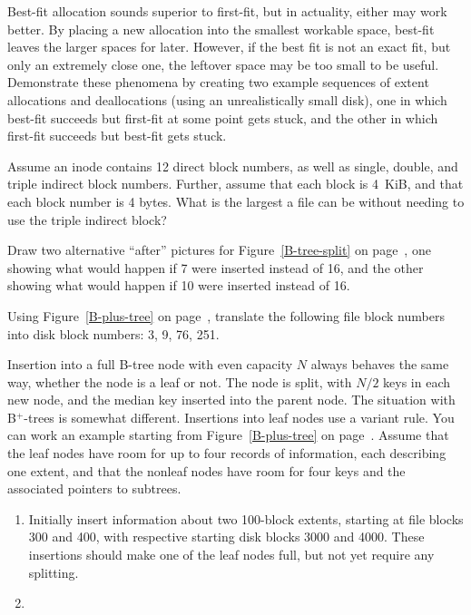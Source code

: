 \begin{chapterEnumerate}
\item\label{best-fit-first-fit-exercise}
Best-fit allocation sounds superior to first-fit, but in actuality,
either may work better.  By placing a new allocation into the smallest
workable space, best-fit leaves the larger spaces for later.  However,
if the best fit is not an exact fit, but only an extremely close one,
the leftover space may be too small to be useful.  Demonstrate these
phenomena by creating two example sequences of extent allocations and
deallocations (using an unrealistically small disk), one in which
best-fit succeeds but first-fit at some point gets stuck, and the
other in which first-fit succeeds but best-fit gets stuck.
\item\label{largest-double-indirect-exercise}
Assume an inode contains 12 direct block numbers, as well as single,
double, and triple indirect block numbers.  Further, assume that each
block is 4~KiB, and that each block number is 4 bytes.  What is the
largest a file can be without needing to use the triple indirect block?
\item
Draw two alternative ``after'' pictures for Figure~\ref{B-tree-split}
on page~\pageref{B-tree-split},
one showing what would happen if 7 were inserted instead of 16, and
the other showing what would happen if 10 were inserted instead of 16.
\item
Using Figure~\ref{B-plus-tree} on page~\pageref{B-plus-tree}, translate the following file block
numbers into disk block numbers: 3, 9, 76, 251.
\item\label{Bplus-tree-insertion-exercise}
Insertion into a full B-tree node with even capacity $N$
always behaves the same way, whether the node is a leaf or not.  The
node is split, with $N/2$ keys in each new node, and the median key
inserted into the parent node.  The situation with B${}^+$-trees is
somewhat different.  Insertions into leaf nodes use a variant rule.
You can work an example starting from
Figure~\ref{B-plus-tree} on page~\pageref{B-plus-tree}.  Assume that
the leaf nodes have room for up to four records of information, each
describing one extent, and that the nonleaf nodes have room for four
keys and the associated pointers to subtrees.
\begin{enumerate}
\item
Initially insert information about two 100-block extents, starting at
file blocks 300 and 400, with respective starting disk blocks 3000 and
4000.  These insertions should make one of the leaf nodes full, but
not yet require any splitting.
\item

\end{enumerate}
\end{chapterEnumerate}
